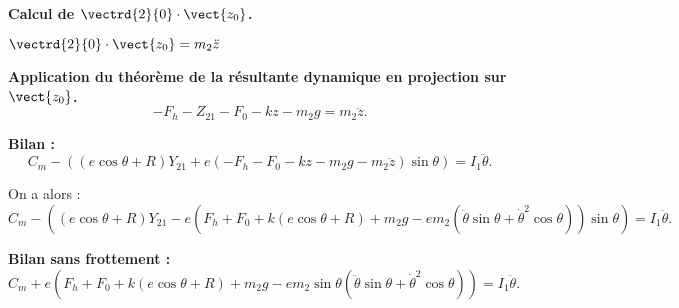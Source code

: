 \textbf{Calcul de $\vectrd{2}{0}\cdot \vect{z_0}$.}
 
$\vectrd{2}{0}\cdot \vect{z_0}=m_2\ddot{z}$

\textbf{Application du théorème de la résultante dynamique en projection sur $\vect{z_0}$.}
$$
-F_h-Z_{21}-F_0-kz-m_2g=m_2\ddot{z}.
$$


\textbf{Bilan :}
$$C_m-\left(\left(e\cos\theta+R\right)Y_{21} +e \left( -F_h-F_0-kz-m_2g-m_2\ddot{z}\right)\sin\theta\right) =I_1\ddot{\theta}.$$

On a alors :
$$C_m-\left(\left(e\cos\theta+R\right)Y_{21} -e \left( F_h+F_0+k\left( e\cos\theta+R \right)+m_2g-em_2\left( \ddot{\theta}\sin\theta+\dot{\theta}^2\cos\theta\right)\right)\sin\theta\right) =I_1\ddot{\theta}.$$


\textbf{Bilan sans frottement :}
$$C_m+e\left(
F_h+F_0+k\left( e\cos\theta+R \right)+m_2g
-em_2\sin\theta\left( \ddot{\theta}\sin\theta+\dot{\theta}^2\cos\theta\right)
\right) =I_1\ddot{\theta}.$$
\else
\fi
